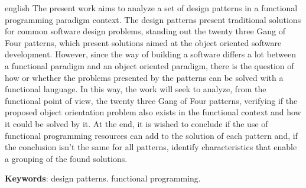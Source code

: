 \begin{resumo}[Abstract]
 \begin{otherlanguage*}{english}
  The present work aims to analyze a set of 
  design patterns in a functional programming 
  paradigm context. The design patterns present 
  traditional solutions for common software design 
  problems, standing out the twenty three Gang 
  of Four patterns, which present solutions 
  aimed at the object oriented software 
  development. However, since the way of building 
  a software differs a lot between a functional 
  paradigm and an object oriented paradigm, there is 
  the question of how or whether the problems 
  presented by the patterns can be solved with 
  a functional language. In this way, the work will 
  seek to analyze, from the functional point of view, 
  the twenty three Gang of Four patterns, verifying if 
  the proposed object orientation problem also 
  exists in the functional context and how it could 
  be solved by it. At the end, it is wished to 
  conclude if the use of functional programming 
  resources can add to the solution of each 
  pattern and, if the conclusion isn't the same 
  for all patterns, identify characteristics 
  that enable a grouping of the found solutions.

   \vspace{\onelineskip}
 
   \noindent 
   \textbf{Keywords}: design patterns. functional programming.
 \end{otherlanguage*}
\end{resumo}


\listoffigures*
\cleardoublepage

\listofquadros*
\cleardoublepage

\begin{KeepFromToc}
\lstlistoflistings
\end{KeepFromToc}
\cleardoublepage

  
  
  \tableofcontents*
  \cleardoublepage
